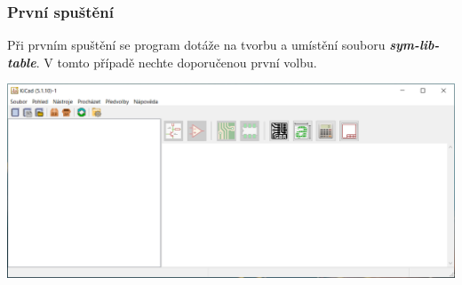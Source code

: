 \documentclass{beamer}
\begin{document}
	\begin{frame}
    \frametitle{První spuštění}
    \small
    Při prvním spuštění se program dotáže na tvorbu a umístění souboru \textit{\textbf{sym-lib-table}}. V tomto případě nechte doporučenou první volbu.
    \begin{center}
			\includegraphics[scale=0.4]{obr/kicad_nabidka.png}
		\end{center}
	\end{frame}

\end{document}
